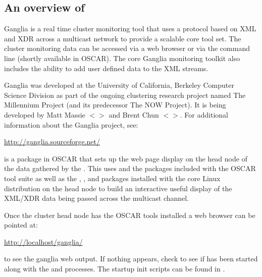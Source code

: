 %
%
%

\subsection{An overview of }
\label{app:ganglia-overview}

Ganglia is a real time cluster monitoring tool that uses a protocol
based on XML and XDR across a multicast network to provide a scalable
core tool set.  The cluster monitoring data can be accessed via a web
browser or via the command line (shortly available in OSCAR). The core
Ganglia monitoring toolkit also includes the ability to add user
defined data to the XML streams.

Ganglia was developed at the University of California, Berkeley
Computer Science Division as part of the ongoing clustering research
project named The Millennium Project (and its predecessor The NOW
Project).  It is being developed by Matt Massie
$<$$>$ and Brent Chun
$<$$>$. For additional information about the
Ganglia project, see:

\vspace{10pt}
\centerline{\url{http://ganglia.sourceforge.net/}}
\vspace{10pt}

 is a package in OSCAR that sets up
the web page display on the head node of the data gathered by the
.  This uses  and the
 packages included with the OSCAR tool suite
as well as the , , and 
packages installed with the core Linux distribution on the head node
to build an interactive useful display of the XML/XDR data being
passed across the multicast channel.

Once the cluster head node has the OSCAR tools installed a web browser
can be pointed at:

\vspace{10pt}
\centerline{\url{http://localhost/ganglia/}}
\vspace{10pt}

\noindent to see the ganglia web output. If nothing appears, check to
see if  has been started along with the  and
 processes. The startup init scripts can be found
in .

